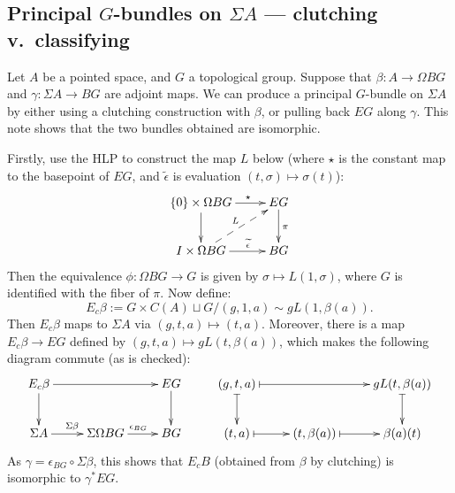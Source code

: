 \documentclass[11pt]{article}
\newcommand{\myheading}[1]
{{\noindent\Large #1}

}
\renewcommand{\myheading}[1]{\subsection{#1}}
\begin{document}
\begin{clutching v classifying}
\myheading{Principal \texorpdfstring{$G$}{G}-bundles on \texorpdfstring{$\Sigma A$}{SA} --- clutching v.\ classifying}
Let $A$ be a pointed space, and $G$ a topological group. Suppose that $\beta:A\to \Omega BG$ and $\gamma:\Sigma A\to BG$ are adjoint maps. We can produce a principal $G$-bundle on $\Sigma A$ by either using a clutching construction with $\beta$, or pulling back $EG$ along $\gamma$. This note shows that the two bundles obtained are isomorphic.

Firstly, use the HLP to construct the map $L$ below (where $\star$ is the constant map to the basepoint of $EG$, and $\widetilde\epsilon$ is evaluation $(t,\sigma)\mapsto \sigma(t)$):
\[\xymatrix{
\{0\}\times\Omega BG\ar[r]^{\ \ \ \ \star}\ar[d]&EG\ar[d]^{\pi}\\
I\times\Omega BG\ar[r]^{\ \ \ \ \widetilde\epsilon}\ar@{-->}[ru]^L&BG
}\]
Then the equivalence $\phi:\Omega BG\to G$ is given by $\sigma\mapsto L(1,\sigma)$, where $G$ is identified with the fiber of $\pi$. Now define:
\[E_c\beta:=G\times C(A)\sqcup G / (g,1,a)\sim gL(1,\beta(a)).\]
Then $E_c\beta$ maps to $\Sigma A$ via $(g,t,a)\mapsto(t,a)$. Moreover, there is a map $E_c\beta\to EG$ defined by $(g,t,a)\mapsto gL(t,\beta(a))$, which makes the following diagram commute (as is checked): 
\[\xymatrix{
E_c\beta\ar[rr]\ar[d]&&EG\ar[d]&
(g,t,a)\ar@{|->}[rr]\ar@{|->}[d]&&gL(t,\beta(a))\ar@{|->}[d]\\
\Sigma A\ar[r]^{\Sigma\beta}&\Sigma\Omega BG\ar[r]^{\epsilon_{BG}}&BG&
(t,a)\ar@{|->}[r]&(t,\beta(a))\ar@{|->}[r]&\beta(a)(t)
}\]
As $\gamma=\epsilon_{BG}\circ\Sigma\beta$, this shows that $E_cB$ (obtained from $\beta$ by clutching) is isomorphic to $\gamma^*EG$.

\end{clutching v classifying}
\end{document}
